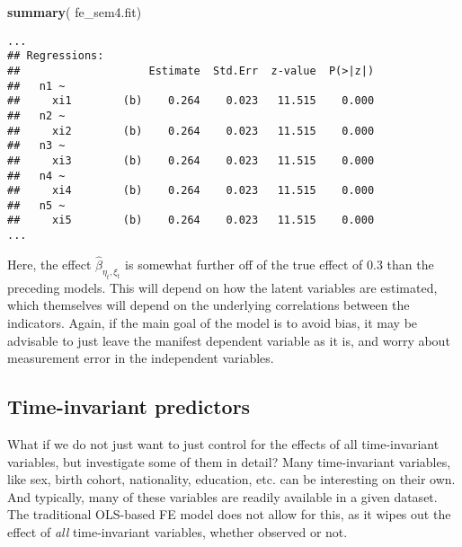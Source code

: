 \documentclass[]{interact}
\theoremstyle{plain}%
\theoremstyle{definition}
\theoremstyle{remark}
\newenvironment{Shaded}{\begin{snugshade}}{\end{snugshade}}
\newcommand{\KeywordTok}[1]{\textcolor[rgb]{0.13,0.29,0.53}{\textbf{#1}}}
\newcommand{\NormalTok}[1]{#1}
\begin{document}
\doublespacing

\singlespacing

\begin{Shaded}
\begin{Highlighting}[]
\KeywordTok{summary}\NormalTok{( fe\_sem4.fit)}
\end{Highlighting}
\end{Shaded}

\begin{verbatim}
...
## Regressions:
##                    Estimate  Std.Err  z-value  P(>|z|)
##   n1 ~                                                
##     xi1        (b)    0.264    0.023   11.515    0.000
##   n2 ~                                                
##     xi2        (b)    0.264    0.023   11.515    0.000
##   n3 ~                                                
##     xi3        (b)    0.264    0.023   11.515    0.000
##   n4 ~                                                
##     xi4        (b)    0.264    0.023   11.515    0.000
##   n5 ~                                                
##     xi5        (b)    0.264    0.023   11.515    0.000
...
\end{verbatim}

\doublespacing

Here, the effect \(\hat{\beta}_{\eta_{t},\xi_{t}}\) is somewhat further
off of the true effect of 0.3 than the preceding models. This will
depend on how the latent variables are estimated, which themselves will
depend on the underlying correlations between the indicators. Again, if
the main goal of the model is to avoid bias, it may be advisable to just
leave the manifest dependent variable as it is, and worry about
measurement error in the independent variables.

\hypertarget{time-invariant-predictors}{%
\subsection{Time-invariant predictors}\label{time-invariant-predictors}}

What if we do not just want to just control for the effects of all
time-invariant variables, but investigate some of them in detail? Many
time-invariant variables, like sex, birth cohort, nationality,
education, etc. can be interesting on their own. And typically, many of
these variables are readily available in a given dataset. The
traditional OLS-based FE model does not allow for this, as it wipes out
the effect of \emph{all} time-invariant variables, whether observed or
not.
\end{document}
